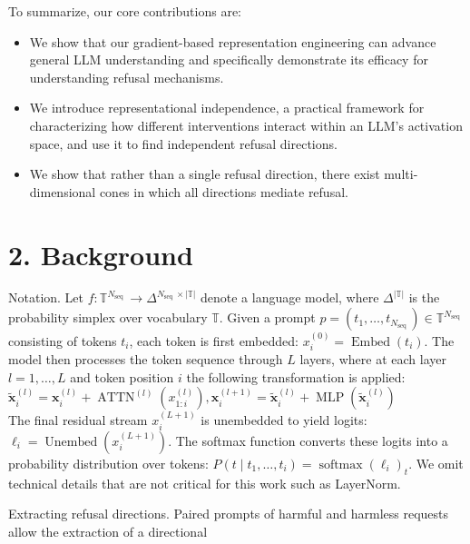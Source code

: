 \documentclass[10pt]{article}
\begin{document}
To summarize, our core contributions are:

\begin{itemize}
  \item We show that our gradient-based representation engineering can advance general LLM understanding and specifically demonstrate its efficacy for understanding refusal mechanisms.
  \item We introduce representational independence, a practical framework for characterizing how different interventions interact within an LLM's activation space, and use it to find independent refusal directions.
  \item We show that rather than a single refusal direction, there exist multi-dimensional cones in which all directions mediate refusal.
\end{itemize}

\section*{2. Background}
Notation. Let $f: \mathbb{T}^{N_{\text {seq }}} \rightarrow \Delta^{N_{\text {seq }} \times|\mathbb{T}|}$ denote a language model, where $\Delta^{|\mathbb{T}|}$ is the probability simplex over vocabulary $\mathbb{T}$. Given a prompt $p=\left(t_{1}, \ldots, t_{N_{\text {seq }}}\right) \in \mathbb{T}^{N_{\text {seq }}}$ consisting of tokens $t_{i}$, each token is first embedded: $x_{i}^{(0)}= \operatorname{Embed}\left(t_{i}\right)$. The model then processes the token sequence through $L$ layers, where at each layer $l=1, \ldots, L$ and token position $i$ the following transformation is applied:\\
$\tilde{\boldsymbol{x}}_{i}^{(l)}=\boldsymbol{x}_{i}^{(l)}+\operatorname{ATTN}^{(l)}\left(x_{1: i}^{(l)}\right), \boldsymbol{x}_{i}^{(l+1)}=\tilde{\boldsymbol{x}}_{i}^{(l)}+\operatorname{MLP}\left(\tilde{\boldsymbol{x}}_{i}^{(l)}\right)$\\
The final residual stream $x_{i}^{(L+1)}$ is unembedded to yield logits: $\ell_{i}=\operatorname{Unembed}\left(x_{i}^{(L+1)}\right)$. The softmax function converts these logits into a probability distribution over tokens: $P\left(t \mid t_{1}, \ldots, t_{i}\right)=\operatorname{softmax}\left(\ell_{i}\right)_{t}$. We omit technical details that are not critical for this work such as LayerNorm.

Extracting refusal directions. Paired prompts of harmful and harmless requests allow the extraction of a directional
\end{document}
